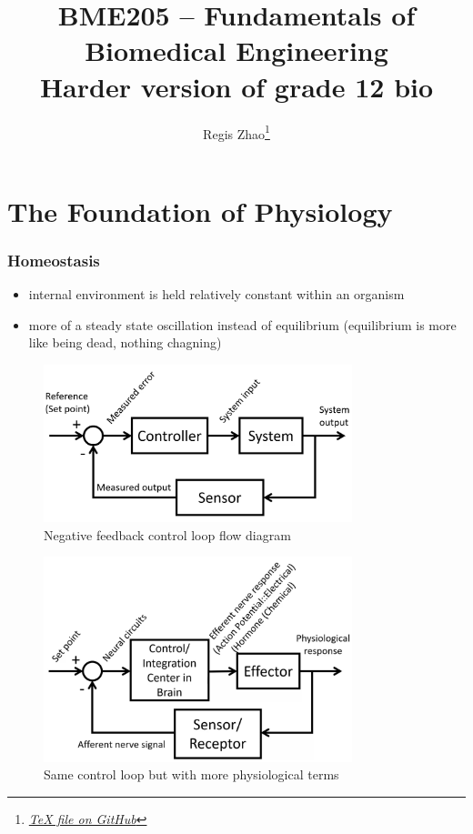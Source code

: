 \documentclass[10pt]{article}
\title{{\Huge BME205 -- Fundamentals of Biomedical Engineering}\\{\Large{Harder version of grade 12 bio}}}
\author{Regis Zhao\footnote{\href{https://google.com/}{\textit{TeX file on GitHub}}}}
\affiliation{University of Toronto}
\begin{document}
\maketitle
\flushbottom
\newpage

\pagestyle{fancynotes}


\part{The Foundation of Physiology}

\section{Homeostasis}
\begin{itemize}
    \item internal environment is held relatively constant within an organism
    \item more of a steady state oscillation instead of equilibrium (equilibrium is more like being dead, nothing chagning)
\end{itemize}
\begin{figure}[h]
    \centering
    \includegraphics[width=0.8\textwidth]{negFeedbackCtrlLoop}
    \caption{Negative feedback control loop flow diagram}
    \label{fig:negFeedbackCtrlLoop}
\end{figure}
\begin{figure}[h]
    \centering
    \includegraphics[width=0.8\textwidth]{negFeedbackCtrlLoopPhysioTerms}
    \caption{Same control loop but with more physiological terms}
    \label{fig:negFeedbackCtrlLoopPhysioTerms}
\end{figure}
\end{document}
